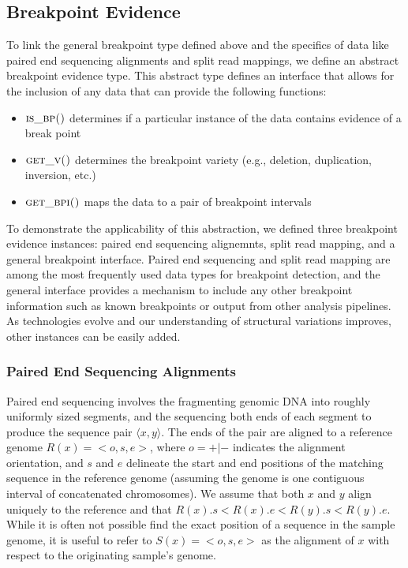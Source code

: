 \documentclass[11pt]{article}
\begin{document}
\subsection{Breakpoint Evidence}

To link the general breakpoint type defined above and the specifics of data like
paired end sequencing alignments and split read mappings, we define an abstract
breakpoint evidence type.  This abstract type defines an interface that allows
for the inclusion of any data that can provide the following functions:

\begin{itemize}
	\item $\textsc{is\_bp()}$ determines if a particular
	instance of the data contains evidence of a break point
	\item $\textsc{get\_v()}$ determines the breakpoint 
	variety (e.g., deletion, duplication, inversion, etc.)
	\item $\textsc{get\_bpi()}$ maps the data to a pair of
	breakpoint intervals
\end{itemize}

To demonstrate the applicability of this abstraction, we defined three
breakpoint evidence instances: paired end sequencing alignemnts, split read
mapping, and a general breakpoint interface.  Paired end sequencing and split
read mapping are among the most frequently used data types for breakpoint
detection, and the general interface provides a mechanism to include any other
breakpoint information such as known breakpoints or output from other analysis
pipelines.  As technologies evolve and our understanding of structural
variations improves, other instances can be easily added.

\subsubsection{Paired End Sequencing Alignments}

Paired end sequencing involves the fragmenting genomic DNA into roughly
uniformly sized segments, and the sequencing both ends of each segment to
produce the sequence pair $\langle x,y \rangle$.  The ends of the pair are
aligned to a reference genome $R(x)=<o,s,e>$, where $o=+|-$ indicates the
alignment orientation, and $s$ and $e$ delineate the start and end positions of
the matching sequence in the reference genome (assuming the genome is one
contiguous interval of concatenated chromosomes).  We assume that both $x$ and
$y$ align uniquely to the reference and that $R(x).s<R(x).e<R(y).s<R(y).e$.
While it is often not possible find the exact position of a sequence in the
sample genome, it is useful to refer to  $S(x)=<o,s,e>$ as the alignment of $x$
with respect to the originating sample's genome.
\end{document}
